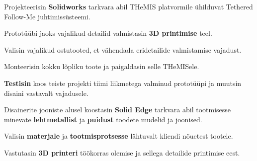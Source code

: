 \documentclass[letterpaper]{deedy-resume} %
\begin{document}
\begin{minipage}[t]{0.66\textwidth}
\sectionspace %



\begin{tightitemize}
  \item Projekteerisin \textbf{Solidworks} tarkvara abil THeMIS platvormile ühilduvat Tethered Follow-Me juhtimissüsteemi.
  \item Prototüübi jaoks vajalikud detailid valmistasin \textbf{3D printimise} teel.
  \item Valisin vajalikud ostutooted, et vähendada eridetailide valmistamise vajadust.
  \item Monteerisin kokku lõpliku toote ja paigaldasin selle THeMISele.
  \item \textbf{Testisin} koos teiste projekti tiimi liikmetega valminud prototüüpi ja muutsin disaini vastavalt vajadusele.
\end{tightitemize}

\sectionspace %



\begin{tightitemize}
  \item Disainerite jooniste alusel koostasin \textbf{Solid Edge} tarkvara abil tootmisesse minevate \textbf{lehtmetallist} ja \textbf{puidust} toodete mudelid ja joonised.
  \item Valisin \textbf{materjale} ja \textbf{tootmisprotsesse} lähtuvalt kliendi nõuetest tootele.
  \item Vastutasin \textbf{3D printeri} töökorras olemise ja sellega detailide printimise eest.
\end{tightitemize}

\sectionspace %




\end{minipage}
\end{document}
